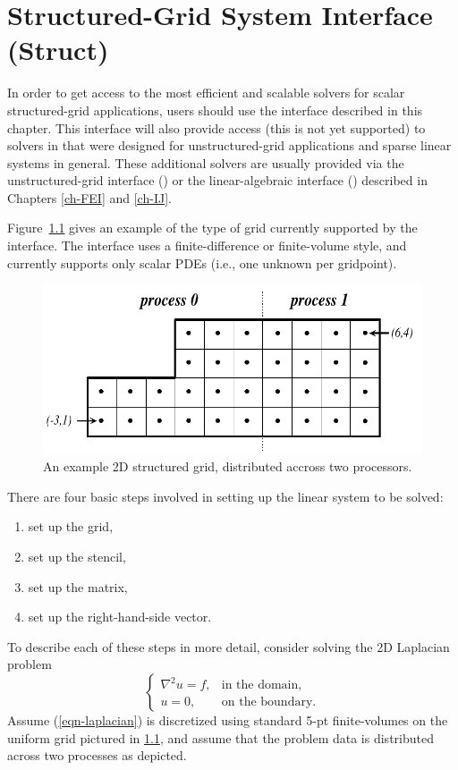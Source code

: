 
\chapter{Structured-Grid System Interface (Struct)}
\label{ch-Struct}

In order to get access to the most efficient and scalable solvers for
scalar structured-grid applications, users should use the
 interface described in this chapter.  This interface
will also provide access (this is not yet supported) to solvers in
\hypre{} that were designed for unstructured-grid applications and
sparse linear systems in general.  These additional solvers are
usually provided via the unstructured-grid interface () or
the linear-algebraic interface () described in Chapters
\ref{ch-FEI} and \ref{ch-IJ}.

Figure~\ref{fig-struct-example} gives an example of the type of grid
currently supported by the  interface.  The interface
uses a finite-difference or finite-volume style, and currently
supports only scalar PDEs (i.e., one unknown per gridpoint).
\begin{figure}
\centering
\includegraphics[width=.5\textwidth]{figStructExample1}
\caption{%
An example 2D structured grid, distributed accross two processors.}
\label{fig-struct-example}
\end{figure}
There are four basic steps involved in setting up the linear system
to be solved:
\begin{enumerate}
\item set up the grid,
\item set up the stencil,
\item set up the matrix,
\item set up the right-hand-side vector.
\end{enumerate}
To describe each of these steps in more detail, consider solving the
2D Laplacian problem
\begin{equation}\label{eqn-laplacian}
\left \{
\begin{array}{ll}
\nabla^2 u = f , & \mbox{in the domain}, \\
u = 0,           & \mbox{on the boundary}.
\end{array}
\right .
\end{equation}
Assume (\ref{eqn-laplacian}) is discretized using standard 5-pt finite-volumes
on the uniform grid pictured in \ref{fig-struct-example}, and assume that the
problem data is distributed across two processes as depicted.


